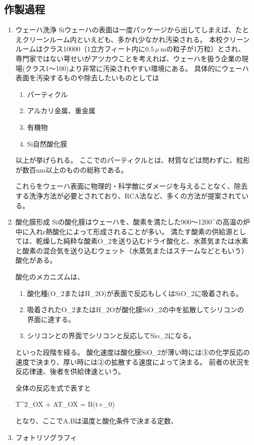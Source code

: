 \documentclass[11pt]{jarticle}
\begin{document}
	\subsection{作製過程}
		\begin{enumerate}
			\item ウェーハ洗浄
				Siウェーハの表面は一度パッケージから出してしまえば、たとえクリーンルーム内といえども、多かれ少なかれ汚染される。
				本校クリーンルームはクラス10000（1立方フィート内に$0.5\,\mu$\,mの粒子が1万粒）とされ、専門家ではない萼せいがアツカウことを考えれば、ウェーハを扱う企業の現場(クラス1〜100)より非常に汚染されやすい環境にある。
				具体的にウェーハ表面を汚染するものや除去したいものとしては

				\begin{enumerate}
					\item パーティクル\\
					\item アルカリ金属、重金属\\
					\item 有機物\\
					\item Si自然酸化膜\\
				\end{enumerate}

				以上が挙げられる。
				ここでのパーティクルとは、材質などは問わずに、粒形が数百nm以上のものの総称である。

				これらをウェーハ表面に物理的・科学敵にダメージを与えることなく、除去する洗浄方法が必要とされており、RCA法など、多くの方法が提案されている。

			\item 酸化膜形成
				Siの酸化膜はウェーハを、酸素を満たした900〜1200^\circ の高温の炉中に入れr熱酸化によって形成されることが多い。
				満たす酸素の供給源としては、乾燥した純粋な酸素O_{2}を送り込むドライ酸化と、水蒸気または水素と酸素の混合気を送り込むウェット（水蒸気またはスチームなどともいう）酸化がある。

				酸化のメカニズムは、
					\begin{enumerate}
						\item 酸化種(O_{2}またはH_{2}O)が表面で反応もしくはSiO_{2}に吸着される。\\
						\item 吸着されたO_{2}またはH_{2}Oが酸化膜SiO_{2}の中を拡散してシリコンの界面に達する。\\
						\item シリコンとの界面でシリコンと反応してSio_{2}になる。\\
					\end{enumerate}
				といった段階を経る。
				酸化速度は酸化膜SiO_{2}が薄い時には③の化学反応の速度で決まり、厚い時には②の拡散する速度によって決まる。
				前者の状況を反応律速、後者を供給律速という。

				全体の反応を式で表すと
				\begin{eqation}
					T^{2}_{OX} + AT_{OX} = B(t+\tau_{0})
				\end{eqation}
				となり、ここでA,Bは温度と酸化条件で決まる定数、

			\item フォトリソグラフィ
		\end{enumerate}
\end{document}
